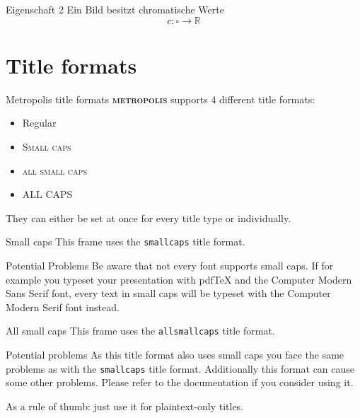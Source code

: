 \documentclass[10pt]{beamer}
\newcommand{\themename}{\textbf{\textsc{metropolis}}\xspace}
\newcommand{\R}{\mathbb{R}}
\begin{document}
\begin{frame}{Eigenschaft 2}
  Ein Bild besitzt \alert{chromatische Werte}
  \begin{equation*}
    c: \square \to \R
  \end{equation*}
\end{frame}



















\section{Title formats}

\begin{frame}{Metropolis title formats}
	\themename supports 4 different title formats:
	\begin{itemize}
		\item Regular
		\item \textsc{Small caps}
		\item \textsc{all small caps}
		\item ALL CAPS
	\end{itemize}
	They can either be set at once for every title type or individually.
\end{frame}

{
\begin{frame}{Small caps}
	This frame uses the \texttt{smallcaps} title format.

	\begin{alertblock}{Potential Problems}
		Be aware that not every font supports small caps. If for example you typeset your presentation with pdfTeX and the Computer Modern Sans Serif font, every text in small caps will be typeset with the Computer Modern Serif font instead.
	\end{alertblock}
\end{frame}
}

{
\begin{frame}{All small caps}
	This frame uses the \texttt{allsmallcaps} title format.

	\begin{alertblock}{Potential problems}
		As this title format also uses small caps you face the same problems as with the \texttt{smallcaps} title format. Additionally this format can cause some other problems. Please refer to the documentation if you consider using it.

		As a rule of thumb: just use it for plaintext-only titles.
	\end{alertblock}
\end{frame}
}
\end{document}
